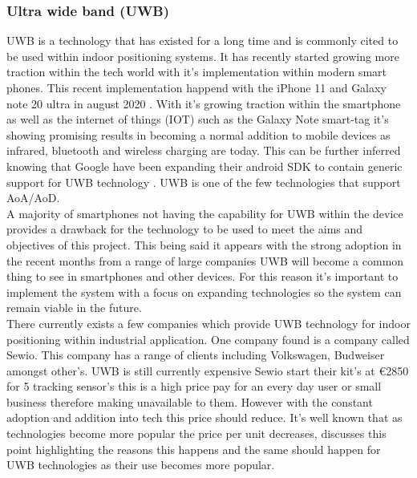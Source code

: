 \subsubsection{Ultra wide band (UWB)}
UWB is a technology that has existed for a long time and is commonly cited to be used within indoor positioning systems. It has recently started growing more traction within the tech world with it's implementation within modern smart phones. This recent implementation happend with the iPhone 11 and Galaxy note 20 ultra in august 2020 \citetemp. With it's growing traction within the smartphone as well as the internet of things (IOT) such as the Galaxy Note smart-tag \citetemp it's showing promising results in becoming a normal addition to mobile devices as infrared, bluetooth and wireless charging are today. This can be further inferred knowing that Google have been expanding their android SDK  to contain generic support for UWB technology \citetemp. UWB is one of the few technologies that support AoA/AoD.\\

A majority of smartphones not having the capability for UWB within the device provides a drawback for the technology to be used to meet the aims and objectives of this project. This being said it appears with the strong adoption in the recent months from a range of large companies UWB will become a common thing to see in smartphones and other devices. For this reason it's important to implement the system with a focus on expanding technologies so the system can remain viable in the future.\\

There currently exists a few companies which provide UWB technology for indoor positioning within industrial application. One company found is a company called Sewio. This company has a range of clients including Volkswagen, Budweiser amongst other’s. UWB is still currently expensive Sewio start their kit's at €2850 for 5 tracking sensor's this is a high price pay for an every day user or small business therefore making unavailable to them. However with the constant adoption and addition into tech this price should reduce. It's well known that as technologies become more popular the price per unit decreases, \citetemp discusses this point highlighting the reasons this happens and the same should happen for UWB technologies as their use becomes more popular.

